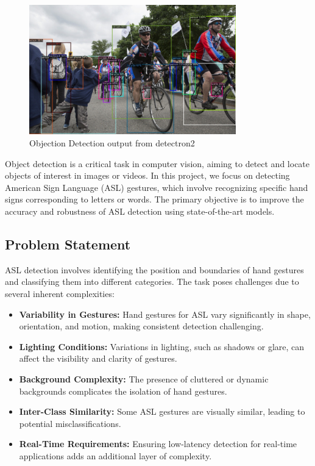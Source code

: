 \documentclass[a4paper]{article}
\begin{document}
\begin{figure}[h!]
    \centering
    \includegraphics[width=0.8\textwidth]{./images/detectron.png}
    \caption{Objection Detection output from detectron2}
    \label{fig:object_detection}
\end{figure}
    Object detection is a critical task in computer vision, aiming to detect and locate objects of interest in images or videos. In this project, we focus on detecting American Sign Language (ASL) gestures, 
    which involve recognizing specific hand signs corresponding to letters or words. The primary objective is to improve the accuracy and robustness of ASL detection using state-of-the-art models.

\subsection{Problem Statement}
ASL detection involves identifying the position and boundaries of hand gestures and classifying them into different categories. The task poses challenges due to several inherent complexities:
\begin{itemize}
    \item \textbf{Variability in Gestures:} Hand gestures for ASL vary significantly in shape, orientation, and motion, making consistent detection challenging.
    \item \textbf{Lighting Conditions:} Variations in lighting, such as shadows or glare, can affect the visibility and clarity of gestures.
    \item \textbf{Background Complexity:} The presence of cluttered or dynamic backgrounds complicates the isolation of hand gestures.
    \item \textbf{Inter-Class Similarity:} Some ASL gestures are visually similar, leading to potential misclassifications.
    \item \textbf{Real-Time Requirements:} Ensuring low-latency detection for real-time applications adds an additional layer of complexity.
\end{itemize}
\end{document}
